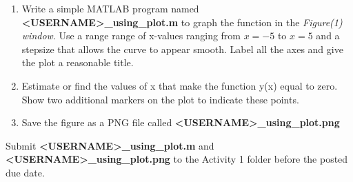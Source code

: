 \documentclass[12pt]{article}
\newcommand{\ANUM}{1} %
\begin{document}
\begin{description}
\begin{enumerate}
\begin{multicols}{2}
	\end{multicols}
	
	\item Write a simple MATLAB program named {\bf \BL<USERNAME>\BK\_using\_plot.m} to graph the function in the {\it Figure(1)  window}. Use a range range of x-values ranging from $x=-5$ to $x=5$ and a stepsize that allows the curve to appear smooth. Label all the axes and give the plot a reasonable title.	
	
	\item Estimate or find the values of x that make the function y(x) equal to zero. Show two additional markers on the plot to indicate these points.
	
	\item Save the figure as a PNG file called {\bf \BL<USERNAME>\BK\_using\_plot.png } 
\end{enumerate}

\item[\textbf{\underline{Submit:}}] \hfill \vspace{0mm}

		Submit {\bf \BL<USERNAME>\BK\_using\_plot.m} and {\bf \BL<USERNAME>\BK\_using\_plot.png } to the Activity \ANUM \hspace{1mm} folder before the posted due date.

\end{description}
\end{document}
